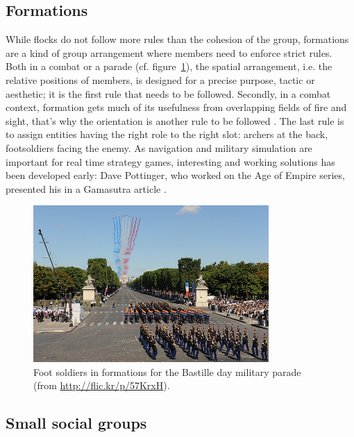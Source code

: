 \documentclass{article}
\begin{document}
\subsection{Formations}
While flocks do not follow more rules than the cohesion of the group, formations are a kind of group arrangement where members need to enforce strict rules. Both in a combat or a parade (cf. figure~\ref{fig:bastille_day}), the spatial arrangement, i.e. the relative positions of members, is designed for a precise purpose, tactic or aesthetic; it is the first rule that needs to be followed. Secondly, in a combat context, formation gets much of its usefulness from overlapping fields of fire and sight, that’s why the orientation is another rule to be followed \cite{Dawson:2002vd}. The last rule is to assign entities having the right role to the right slot: archers at the back, footsoldiers facing the enemy. As navigation and military simulation are important for real time strategy games, interesting and working solutions has been developed early: Dave Pottinger, who worked on the Age of Empire series, presented his in a Gamasutra article \cite{Pottinger:1999vk}.

\begin{figure}[htb]
\centering
\includegraphics[width=0.8\textwidth]{BastilleDay.jpg}
\caption{Foot soldiers in formations for the Bastille day military parade (from \url{http://flic.kr/p/57KrxH}).}
\label{fig:bastille_day}
\end{figure}

\subsection{Small social groups}
\end{document}
